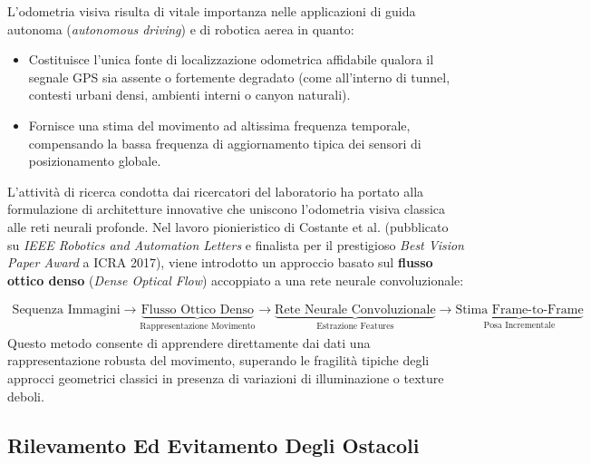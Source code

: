 ﻿\documentclass[11pt, a4paper]{article}
\begin{document}
L'odometria visiva risulta di vitale importanza nelle applicazioni di guida autonoma (\emph{autonomous driving}) e di robotica aerea in quanto:
\begin{itemize}[noitemsep]
    \item Costituisce l'unica fonte di localizzazione odometrica affidabile qualora il segnale GPS sia assente o fortemente degradato (come all'interno di tunnel, contesti urbani densi, ambienti interni o canyon naturali).
    \item Fornisce una stima del movimento ad altissima frequenza temporale, compensando la bassa frequenza di aggiornamento tipica dei sensori di posizionamento globale.
\end{itemize}


L'attività di ricerca condotta dai ricercatori del laboratorio ha portato alla formulazione di architetture innovative che uniscono l'odometria visiva classica alle reti neurali profonde. Nel lavoro pionieristico di Costante et al. (pubblicato su \emph{IEEE Robotics and Automation Letters} e finalista per il prestigioso \emph{Best Vision Paper Award} a ICRA 2017), viene introdotto un approccio basato sul \textbf{flusso ottico denso} (\emph{Dense Optical Flow}) accoppiato a una rete neurale convoluzionale:

{\small
\begin{align*}
    \text{Sequenza Immagini}
    \longrightarrow
    \underbrace{\text{Flusso Ottico Denso}}_{\text{Rappresentazione Movimento}}
    \longrightarrow
    \underbrace{\text{Rete Neurale Convoluzionale}}_{\text{Estrazione Features}}
    \longrightarrow
    \underbrace{\text{Stima Frame-to-Frame}}_{\text{Posa Incrementale}}
\end{align*}
}
Questo metodo consente di apprendere direttamente dai dati una rappresentazione robusta del movimento, superando le fragilità tipiche degli approcci geometrici classici in presenza di variazioni di illuminazione o texture deboli.


\newpage

\subsection{Rilevamento Ed Evitamento Degli Ostacoli}
\end{document}
